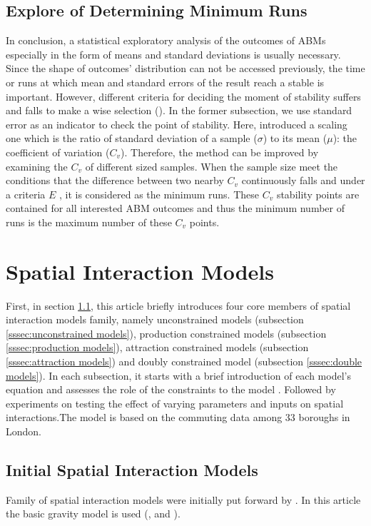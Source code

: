 \documentclass[a4paper,reqno,]{article}
\begin{document}
\subsection{Explore of Determining Minimum Runs}
In conclusion, a statistical exploratory analysis of the outcomes of ABMs especially in the form of means and standard deviations is usually necessary. Since the shape of outcomes' distribution can not be accessed previously, the time or runs at which mean and standard errors of the result reach a stable is important. However, different criteria for deciding the moment of stability suffers and falls to make a wise selection (\cite{lee2015complexities}). 
In the former subsection, we use standard error as an indicator to check the point of stability. Here, \citeauthor{lee2015complexities} introduced a scaling one which is the ratio of standard deviation of a sample ($\sigma$) to its mean ($\mu$): the coefficient of variation ($C_{v}$). 
Therefore, the method can be improved by examining the  $C_{v}$ of different sized samples. When the sample size meet the conditions that the difference between two  nearby $C_{v}$ continuously falls and under a criteria $E$ , it is considered as the minimum runs.  These $C_{v}$ stability points are contained for all interested ABM outcomes and thus the minimum number of runs is the maximum number of these $C_{v}$ points.


\newpage
\section{Spatial Interaction Models}
\label{sec:spatial}
First, in section \ref{ssec:spatial models}, this article briefly introduces four core members of spatial interaction models family, namely unconstrained models (subsection \ref{sssec:unconstrained models}), production constrained models (subsection \ref{sssec:production models}), attraction constrained models (subsection \ref{sssec:attraction models}) and doubly constrained model (subsection \ref{sssec:double models}). In each subsection, it starts with a brief introduction of each model's equation and assesses the role of the constraints to the model . Followed by experiments on testing the effect of varying parameters and  inputs on spatial interactions.The model is based on the commuting data among 33 boroughs in London.
\subsection{Initial Spatial Interaction Models}
\label{ssec:spatial models}
Family of spatial interaction models were initially put forward by \cite{wilson1971family}. In this article the basic gravity model is used (\cite{dennett2012estimating}, \cite{oshan2016primer} and \cite{rodrigue2016geography}).
\end{document}
